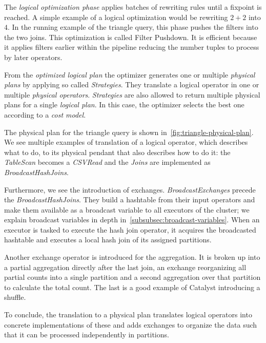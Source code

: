 The \textit{logical optimization phase} applies batches of rewriting rules until a fixpoint is reached.
A simple example of a logical optimization would be rewriting $2 + 2$ into $4$.
In the running example of the triangle query, this phase pushes the filters into the two joins.
This optimization is called Filter Pushdown.
It is efficient because it applies filters earlier within the pipeline reducing the number tuples to process by later operators.

From the \textit{optimized logical plan} the optimizer generates one or multiple \textit{physical plans} by
applying so called \textit{Strategies}.
They translate a logical operator in one or multiple \textit{physical operators}.
\textit{Strategies} are also allowed to return multiple physical plans for a single \textit{logical plan}.
In this case, the optimizer selects the best one according to a \textit{cost model}.

The physical plan for the triangle query is shown in~\cref{fig:triangle-physical-plan}.
We see multiple examples of translation of a logical operator, which describes what to do, to its physical pendant that also
describes how to do it: the \textit{TableScan} becomes a \textit{CSVRead} and the \textit{Joins} are implemented as
\textit{BroadcastHashJoins}.

Furthermore, we see the introduction of exchanges.
\textit{BroadcastExchanges} precede the \textit{BroadcastHashJoins}.
They build a hashtable from their input operators and make them available as a broadcast variable to all executors of the cluster;
we explain broadcast variables in depth in~\cref{subsubsec:broadcast-variables}.
When an executor is tasked to execute the hash join operator, it acquires the broadcasted hashtable and executes a local hash join
of its assigned partitions.

Another exchange operator is introduced for the aggregation.
It is broken up into a partial aggregation directly after the last join, an exchange reorganizing all partial counts into a single
partition and a second aggregation over that partition to calculate the total count.
The last is a good example of Catalyst introducing a shuffle.

To conclude, the translation to a physical plan translates logical operators into concrete implementations of these and adds exchanges
to organize the data such that it can be processed independently in partitions.

